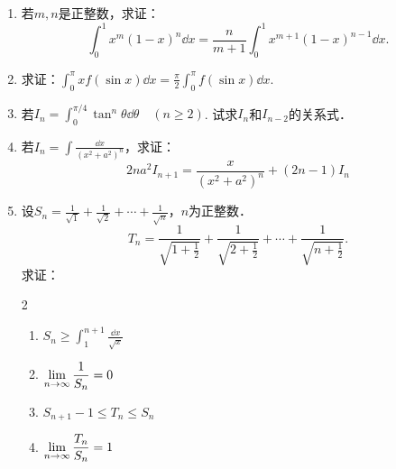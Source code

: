 \begin{enumerate}
\item 若$m,n$是正整数，求证：
\[\int^1_0 x^m (1-x)^n\dd x=\frac{n}{m+1}\int^1_0x^{m+1}(1-x)^{n-1}\dd x. \]
\item 求证：$\displaystyle\int^\pi_0 xf(\sin x)\dd x=\frac{\pi}{2}\int^\pi_0f(\sin x)\dd x$.
\item 若$I_n=\displaystyle\int^{\pi/4}_0 \tan^n \theta \dd \theta\quad (n\ge 2)$. 试求$I_n$和$I_{n-2}$的关系式．
\item 若$I_n=\displaystyle\int \frac{\dd x}{(x^2+a^2)^n}$，求证：
\[2na^2I_{n+1}=\frac{x}{(x^2+a^2)^n}+(2n-1)I_n\]
\item 设$S_n=\frac{1}{\sqrt{1}}+\frac{1}{\sqrt{2}}+\cdots+\frac{1}{\sqrt{n}}$，$n$为正整数．
\[T_n=\frac{1}{\sqrt{1+\frac{1}{2}}}+\frac{1}{\sqrt{2+\frac{1}{2}}}+\cdots+\frac{1}{\sqrt{n+\frac{1}{2}}}.\]
求证：
\begin{multicols}{2}
\begin{enumerate}
    \item $S_n\ge \displaystyle\int^{n+1}_1 \frac{\dd x}{\sqrt{x}}$
    \item $\displaystyle\lim_{n\to\infty}\dfrac{1}{S_n}=0$
    \item $S_{n+1}-1\le T_n\le S_n$
    \item $\displaystyle\lim_{n\to\infty}\dfrac{T_n}{S_n}=1$
\end{enumerate}
\end{multicols}


\end{enumerate}

